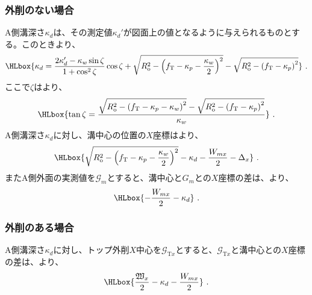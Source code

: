 \subsubsection{外削のない場合}
A側溝深さ$\kappa_d$は、その測定値$\kappa_d'$が図面上の値となるように与えられるものとする。このときより、
\begin{align*}
  \HLbox{%
    \kappa_d
    = \frac{2\kappa_d'-\kappa_w\sin\zeta}{1+\cos^2\zeta}\cos\zeta
      +\sqrt{R_\mathrm o^2-\left(f_\mathrm T-\kappa_p-\frac{\kappa_w}2\right)^2}
      -\sqrt{R_\mathrm o^2-\left(f_\mathrm T-\kappa_p\right)^2}%
  }\ .
\end{align*}
ここで$\zeta$はより、
\begin{align*}
  \HLbox{%
    \tan\zeta
    = \frac{\sqrt{R_\mathrm o^2-\left(f_\mathrm T-\kappa_p-\kappa_w\right)^2}
            -\sqrt{R_\mathrm o^2-\left(f_\mathrm T-\kappa_p\right)^2}}
           {\kappa_w}%
  }\ .
\end{align*}
A側溝深さ$\kappa_d$に対し、溝中心の位置の$X$座標はより、
\begin{align*}
  \HLbox{%
    \sqrt{R_\mathrm o^2-\left(f_\mathrm T-\kappa_p-\frac{\kappa_w}2\right)^2}
    -\kappa_d
    -\frac{W_{mx}}2
    -\Delta_x%
  }\ .
\end{align*}
またA側外面の実測値を$\mathcal G_m$とすると、溝中心と$G_m$との$X$座標の差は、より、
\begin{align*}
  \HLbox{-\frac{W_{mx}}2-\kappa_d}\ .
\end{align*}

\clearpage
\subsubsection{外削のある場合}
A側溝深さ$\kappa_d$に対し、トップ外削$X$中心を$\mathcal G_{\mathrm Tx}$とすると、$\mathcal G_{\mathrm Tx}$と溝中心との$X$座標の差は、より、
\begin{align*}
  \HLbox{\frac{\mathfrak W_x}2-\kappa_d-\frac{W_{mx}}2}\ .
\end{align*}



